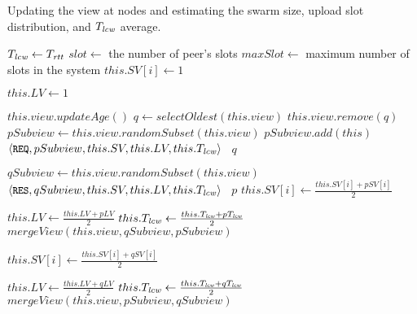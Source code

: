 \begin{algorithm}[!ht]
\caption{Updating the view at nodes and estimating the swarm size, upload slot distribution, and $T_{\mathit{lcw}}$ average.}
\begin{scriptsize}
\label{src:shuffle_view}
\PROCEDURE{\init()} {
   \INTEGER $T_{\mathit{lcw}} \gets T_{\mathit{rtt}}$\;
   \INTEGER $slot \gets$ the number of peer's slots\;
   \INTEGER $maxSlot \gets$ maximum number of slots in the system\;
    {
      {
        $this.SV[i] \gets 1$\;
     } 
   }

    {
      $this.LV \gets 1$\;
   } 
}

\BlankLine
\BlankLine
{} {
  $this.view.updateAge()$\;
  $q \gets selectOldest(this.view)$\;
  $this.view.remove(q)$\;
  $pSubview \gets this.view.randomSubset(this.view)$\;
  $pSubview.add(this)$\;
  \SEND $\langle \texttt{\small REQ}, pSubview, this.SV, this.LV, this.T_{\mathit{lcw}} \rangle$ \TO\ $q$\;
}

\BlankLine
\BlankLine
{} {
  $qSubview \gets this.view.randomSubset(this.view)$\;
  \SEND $\langle \texttt{\small RES}, qSubview, this.SV, this.LV, this.T_{\mathit{lcw}} \rangle$ \TO\ $p$\;
   {
    $this.SV[i] \gets \frac{this.SV[i] + pSV[i]}{2}$\;
  }
  
  $this.LV \gets \frac{this.LV + pLV}{2}$\;
  $this.T_{\mathit{lcw}} \gets \frac{this.T_{\mathit{lcw}} + pT_{\mathit{lcw}}}{2}$\;
  $mergeView(this.view, qSubview, pSubview)$\;
}

\BlankLine
\BlankLine
{} {
   {
    $this.SV[i] \gets \frac{this.SV[i] + qSV[i]}{2}$ \;
  }
  
  $this.LV \gets \frac{this.LV + qLV}{2}$\;
  $this.T_{\mathit{lcw}} \gets \frac{this.T_{\mathit{lcw}} + qT_{\mathit{lcw}}}{2}$\;
  $mergeView(this.view, pSubview, qSubview)$\;
}

\BlankLine
\BlankLine
{}

\end{scriptsize}
\end{algorithm}


